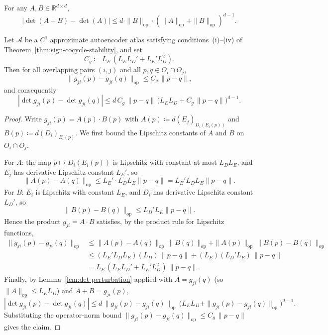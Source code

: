 \documentclass[10pt,a4paper]{amsart}
\newcommand{\R}{\mathbb{R}}
\begin{document}
\begin{lemma}\label{lem:det-perturbation}
For any $A, B \in \R^{d \times d}$,
\[
|\det(A + B) - \det(A)| \leq d \cdot \|B\|_{\mathrm{op}} \cdot (\|A\|_{\mathrm{op}} + \|B\|_{\mathrm{op}})^{d-1}.
\]
\end{lemma}

\begin{lemma}\label{lem:Ldet}
Let $\mathcal{A}$ be a $C^1$ approximate autoencoder atlas satisfying conditions~(i)--(iv) of Theorem~\ref{thm:sign-cocycle-stability}, and set
\[
C_g \coloneqq L_E\,(L_E L_D' + L_E' L_D^2).
\]
Then for all overlapping pairs $(i, j)$ and all $p, q \in O_i \cap O_j$,
\[
\|g_{ji}(p) - g_{ji}(q)\|_{\mathrm{op}} \leq C_g\,\|p - q\|,
\]
and consequently
\[
|\det g_{ji}(p) - \det g_{ji}(q)| \leq d\,C_g\,\|p - q\|\,\bigl(L_E L_D + C_g\,\|p - q\|\bigr)^{d-1}.
\]
\end{lemma}

\begin{proof}
Write $g_{ji}(p) = A(p) \cdot B(p)$ with $A(p) \coloneqq d(E_j)_{D_i(E_i(p))}$ and $B(p) \coloneqq d(D_i)_{E_i(p)}$. We first bound the Lipschitz constants of $A$ and $B$ on $O_i \cap O_j$.

For $A$: the map $p \mapsto D_i(E_i(p))$ is Lipschitz with constant at most $L_D L_E$, and $E_j$ has derivative Lipschitz constant $L_E'$, so
\[
\|A(p) - A(q)\|_{\mathrm{op}} \leq L_E' \cdot L_D L_E \|p - q\| = L_E' L_D L_E \|p - q\|.
\]
For $B$: $E_i$ is Lipschitz with constant $L_E$, and $D_i$ has derivative Lipschitz constant $L_D'$, so
\[
\|B(p) - B(q)\|_{\mathrm{op}} \leq L_D' L_E \|p - q\|.
\]
Hence the product $g_{ji} = A \cdot B$ satisfies, by the product rule for Lipschitz functions,
\begin{align*}
\|g_{ji}(p) - g_{ji}(q)\|_{\mathrm{op}}
&\leq \|A(p) - A(q)\|_{\mathrm{op}}\, \|B(q)\|_{\mathrm{op}} + \|A(p)\|_{\mathrm{op}}\, \|B(p) - B(q)\|_{\mathrm{op}} \\
&\leq (L_E' L_D L_E)(L_D)\,\|p - q\| + (L_E)(L_D' L_E)\,\|p - q\| \\
&= L_E\,(L_E L_D' + L_E' L_D^2)\,\|p - q\|.
\end{align*}
Finally, by Lemma~\ref{lem:det-perturbation} applied with $A = g_{ji}(q)$ (so $\|A\|_{\mathrm{op}} \leq L_E L_D$) and $A + B = g_{ji}(p)$,
\[
|\det g_{ji}(p) - \det g_{ji}(q)|
\leq d\,\|g_{ji}(p) - g_{ji}(q)\|_{\mathrm{op}}\,
\bigl(L_E L_D + \|g_{ji}(p) - g_{ji}(q)\|_{\mathrm{op}}\bigr)^{d-1}.
\]
Substituting the operator-norm bound $\|g_{ji}(p) - g_{ji}(q)\|_{\mathrm{op}} \leq C_g\,\|p-q\|$ gives the claim. \qedhere
\end{proof}
\end{document}
